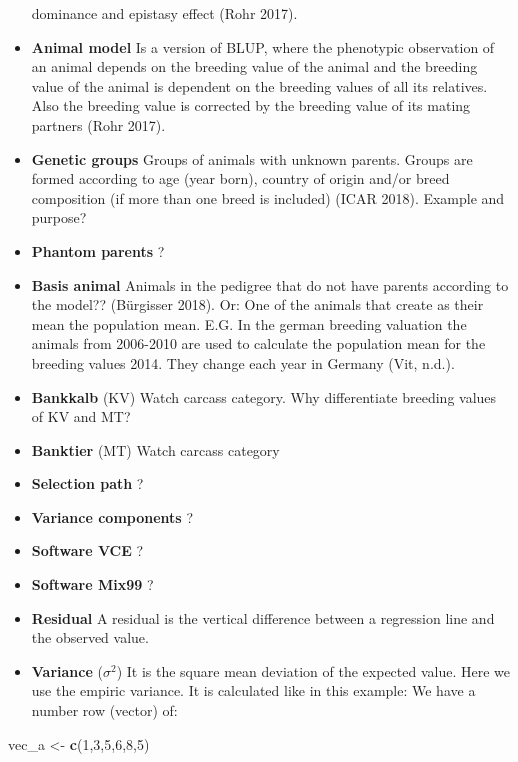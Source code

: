 \documentclass[]{article}
\newenvironment{Shaded}{\begin{snugshade}}{\end{snugshade}}
\newcommand{\KeywordTok}[1]{\textcolor[rgb]{0.13,0.29,0.53}{\textbf{#1}}}
\newcommand{\DecValTok}[1]{\textcolor[rgb]{0.00,0.00,0.81}{#1}}
\newcommand{\StringTok}[1]{\textcolor[rgb]{0.31,0.60,0.02}{#1}}
\newcommand{\NormalTok}[1]{#1}
\begin{document}
\begin{itemize}
  dominance and epistasy effect (Rohr 2017).
\item
  \textbf{Animal model} Is a version of BLUP, where the phenotypic
  observation of an animal depends on the breeding value of the animal
  and the breeding value of the animal is dependent on the breeding
  values of all its relatives. Also the breeding value is corrected by
  the breeding value of its mating partners (Rohr 2017).
\item
  \textbf{Genetic groups} Groups of animals with unknown parents. Groups
  are formed according to age (year born), country of origin and/or
  breed composition (if more than one breed is included) (ICAR 2018).
  Example and purpose?
\item
  \textbf{Phantom parents} ?
\item
  \textbf{Basis animal} Animals in the pedigree that do not have parents
  according to the model?? (Bürgisser 2018). Or: One of the animals that
  create as their mean the population mean. E.G. In the german breeding
  valuation the animals from 2006-2010 are used to calculate the
  population mean for the breeding values 2014. They change each year in
  Germany (Vit, n.d.).
\item
  \textbf{Bankkalb} (KV) Watch carcass category. Why differentiate
  breeding values of KV and MT?
\item
  \textbf{Banktier} (MT) Watch carcass category
\item
  \textbf{Selection path} ?
\item
  \textbf{Variance components} ?
\item
  \textbf{Software VCE} ?
\item
  \textbf{Software Mix99} ?
\item
  \textbf{Residual} A residual is the vertical difference between a
  regression line and the observed value.
\item
  \textbf{Variance} (\(\sigma^2\)) It is the square mean deviation of
  the expected value. Here we use the empiric variance. It is calculated
  like in this example: We have a number row (vector) of:
\end{itemize}

\begin{Shaded}
\begin{Highlighting}[]
\NormalTok{vec_a <-}\StringTok{ }\KeywordTok{c}\NormalTok{(}\DecValTok{1}\NormalTok{,}\DecValTok{3}\NormalTok{,}\DecValTok{5}\NormalTok{,}\DecValTok{6}\NormalTok{,}\DecValTok{8}\NormalTok{,}\DecValTok{5}\NormalTok{)}
\end{Highlighting}
\end{Shaded}
\end{document}
